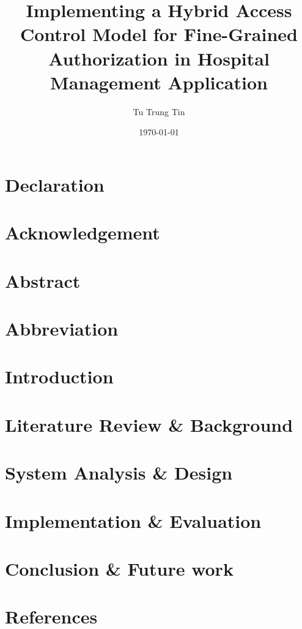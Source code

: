 \documentclass[12pt,oneside]{report}
\title{Implementing a Hybrid Access Control Model for Fine-Grained Authorization in Hospital Management Application}
\author{Tu Trung Tin}
\date{\today}
\begin{document}
\renewcommand\bibname{References}



\chapter*{\centering Declaration}


\chapter*{\centering Acknowledgement}


\chapter*{\centering Abstract}


\chapter*{Abbreviation}


\listoffigures
\listoftables

\renewcommand{\contentsname}{Table of Contents}
\tableofcontents

\pagestyle{fancy}

\fancyhead{}
\fancyfoot{}
\fancyfoot[R]{\thepage}

\renewcommand{\headrulewidth}{0.4pt}
\renewcommand{\footrulewidth}{0.4pt}

\chapter{Introduction}


\chapter{Literature Review \& Background}


\chapter{System Analysis \& Design}


\chapter{Implementation \& Evaluation}
\label{chap:implementaion}


\chapter{Conclusion \& Future work}


\chapter*{References}
\printbibliography[heading=none]
\end{document}
